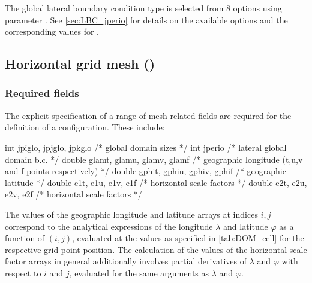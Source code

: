 \documentclass[../main/NEMO_manual]{subfiles}
\begin{document}
The global lateral boundary condition type is selected from 8 options using parameter .
See \autoref{sec:LBC_jperio} for details on the available options and
the corresponding values for .

\subsection[Horizontal grid mesh (\textit{domhgr.F90}]{Horizontal grid mesh (\protect{})}
\label{subsec:DOM_hgr}

\subsubsection{Required fields}
\label{sec:DOM_hgr_fields}

The explicit specification of a range of mesh-related fields are required for
the definition of a configuration.
These include:

\begin{clines}
int    jpiglo, jpjglo, jpkglo     /* global domain sizes                                    */
int    jperio                     /* lateral global domain b.c.                             */
double glamt, glamu, glamv, glamf /* geographic longitude (t,u,v and f points respectively) */
double gphit, gphiu, gphiv, gphif /* geographic latitude                                    */
double e1t, e1u, e1v, e1f         /* horizontal scale factors                               */
double e2t, e2u, e2v, e2f         /* horizontal scale factors                               */
\end{clines}

The values of the geographic longitude and latitude arrays at indices $i,j$ correspond to
the analytical expressions of the longitude $\lambda$ and latitude $\varphi$ as a function of $(i,j)$,
evaluated at the values as specified in \autoref{tab:DOM_cell} for the respective grid-point position.
The calculation of the values of the horizontal scale factor arrays in general additionally involves
partial derivatives of $\lambda$ and $\varphi$ with respect to $i$ and $j$,
evaluated for the same arguments as $\lambda$ and $\varphi$.

\end{document}
